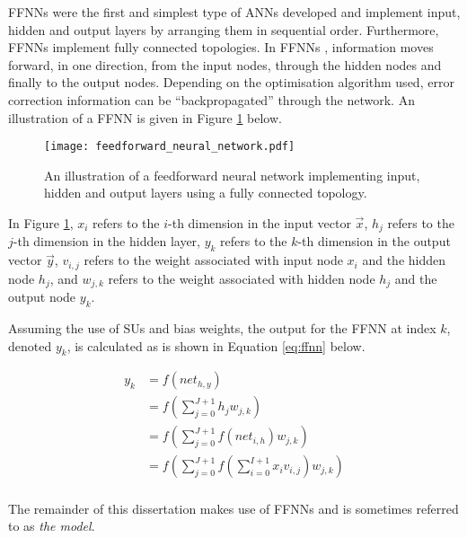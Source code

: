 \acp{FFNN} were the first and simplest type of \acp{ANN} developed \cite{ref:schmidhuber:2015} and implement input, hidden and output layers by arranging them in sequential order. Furthermore, \acp{FFNN} implement fully connected topologies. In \acp{FFNN} , information moves forward, in one direction, from the input nodes, through the hidden nodes and finally to the output nodes. Depending on the optimisation algorithm used, error correction information can be ``backpropagated'' through the network. An illustration of a \ac{FFNN} is given in Figure \ref{fig:ffnn} below.

\begin{figure}[htpb]
    \centering
    \texttt{[image: feedforward\_neural\_network.pdf]}
    \caption[A Feedforward neural network]{An illustration of a feedforward neural network implementing input, hidden and output layers using a fully connected topology.}
    \label{fig:ffnn}
\end{figure}

In Figure \ref{fig:ffnn}, $x_i$ refers to the $i$-th dimension in the input vector $\vec{x}$, $h_j$ refers to the $j$-th dimension in the hidden layer, $y_k$ refers to the $k$-th dimension in the output vector $\vec{y}$, $v_{i,j}$ refers to the weight associated with input node $x_i$ and the hidden node $h_j$, and $w_{j,k}$ refers to the weight associated with hidden node $h_j$ and the output node $y_k$.

Assuming the use of \acp{SU} and bias weights, the output for the \ac{FFNN} at index $k$, denoted $y_k$, is calculated as is shown in Equation \eqref{eq:ffnn} below.

\begin{equation}
    \label{eq:ffnn}
    \begin{split}
        y_k &= f\left(net_{h,y}\right) \\
        &= f\left(\sum_{j=0}^{J+1} h_j w_{j,k}\right) \\
        &= f\left(\sum_{j=0}^{J+1} f\left(net_{i,h}\right) w_{j,k}\right) \\
        &= f\left(\sum_{j=0}^{J+1} f\left(\sum_{i=0}^{I+1} x_i v_{i,j}\right) w_{j,k}\right) \\
    \end{split}
\end{equation}

\noindent
The remainder of this dissertation makes use of \acp{FFNN} and is sometimes referred to as \textit{the model}.


